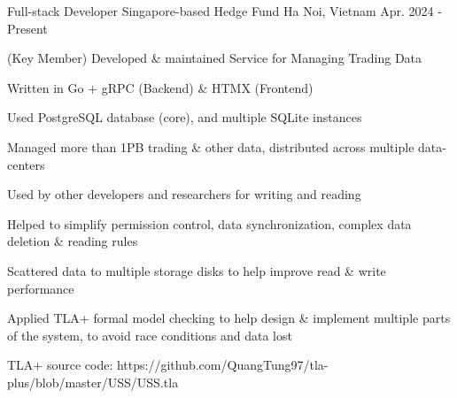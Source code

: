 


\begin{cventries}


\cventry
{Full-stack Developer} %
{Singapore-based Hedge Fund} %
{Ha Noi, Vietnam} %
{Apr. 2024 - Present} %
{ %
\begin{cvitems}
\item{(Key Member) Developed \& maintained Service for Managing Trading Data}
\item{Written in Go + gRPC (Backend) \& HTMX (Frontend)}
\item{Used PostgreSQL database (core), and multiple SQLite instances}
\item{Managed more than 1PB trading \& other data, distributed across multiple data-centers}
\item{Used by other developers and researchers for writing and reading}
\item{Helped to simplify permission control, data synchronization, complex data deletion \& reading rules}
\item{Scattered data to multiple storage disks to help improve read \& write performance}
\item{Applied TLA+ formal model checking to help design \& implement multiple parts of the system, to avoid race conditions and data lost}
\item{TLA+ source code: https://github.com/QuangTung97/tla-plus/blob/master/USS/USS.tla}
\end{cvitems}
}



\end{cventries}
